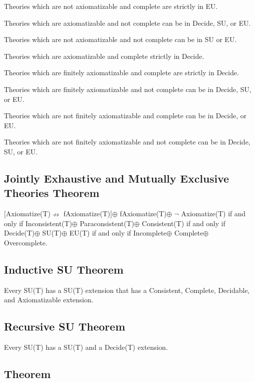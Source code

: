 Theories which are not axiomatizable and complete are strictly in EU.

Theories which are axiomatizable and not complete can be in Decide, SU,
or EU.

Theories which are not axiomatizable and not complete can be in SU or
EU.

Theories which are axiomatizable and complete strictly in Decide.

Theories which are finitely axiomatizable and complete are strictly in
Decide.

Theories which are finitely axiomatizable and not complete can be in
Decide, SU, or EU.

Theories which are not finitely axiomatizable and complete can be in
Decide, or EU.

Theories which are not finitely axiomatizable and not complete can be in
Decide, SU, or EU.

\hypertarget{jointly-exhaustive-and-mutually-exclusive-theories-theorem}{%
\subsection{Jointly Exhaustive and Mutually Exclusive Theories
Theorem}\label{jointly-exhaustive-and-mutually-exclusive-theories-theorem}}

{[}Axiomatize(T)$\nrightarrow$ fAxiomatize(T){]}$\oplus$ fAxiomatize(T)$\oplus$ $\neg$ Axiomatize(T) if and
only if Inconsistent(T)$\oplus$ Paraconsistent(T)$\oplus$ Consistent(T) if and only if
Decide(T)$\oplus$ SU(T)$\oplus$ EU(T) if and only if Incomplete$\oplus$ Complete$\oplus$ Overcomplete.

\hypertarget{inductive-su-theorem}{%
\subsection{Inductive SU Theorem}\label{inductive-su-theorem}}

Every SU(T) has a SU(T) extension that has a Consistent, Complete,
Decidable, and Axiomatizable extension.

\hypertarget{recursive-su-theorem}{%
\subsection{Recursive SU Theorem}\label{recursive-su-theorem}}

Every SU(T) has a SU(T) and a Decide(T) extension.

\hypertarget{theorem-8}{%
\subsection{Theorem}\label{theorem-8}}

